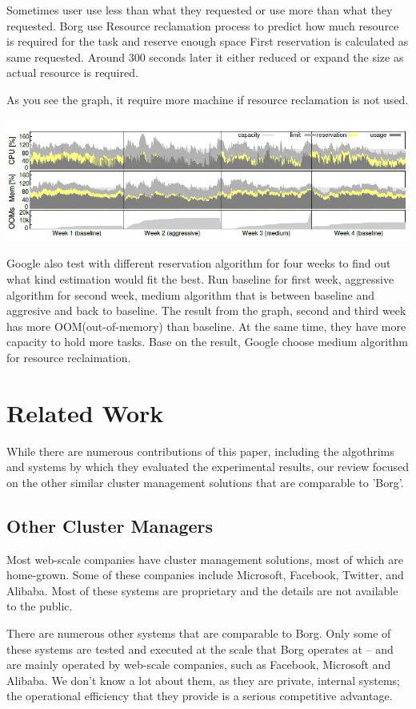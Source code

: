 \documentclass[runningheads,a4paper]{llncs}
\begin{document}
 Sometimes user use less than what they requested or use more than what they requested.
Borg use Resource reclamation process to predict how much resource is required for the task and reserve enough space
First reservation is calculated as same requested. Around 300 seconds later it either reduced or expand the size as actual resource is required.

As you see the graph, it require more machine if resource reclamation is not used.

\includegraphics{reclamation2}

Google also test with different reservation algorithm for four weeks to find out what kind estimation would fit the best.
Run baseline for first week, aggressive algorithm for second week, medium algorithm that is between baseline and aggresive and back to baseline.
The result from the graph, second and third week has more OOM(out-of-memory) than baseline.
At the same time, they have more capacity to hold more tasks.
Base on the result, Google choose medium algorithm for resource reclaimation.

\section{Related Work}
While there are numerous contributions of this paper, including the algothrims and systems by which they evaluated the experimental results, our review focused on the other similar cluster management solutions that are comparable to 'Borg'.

\subsection{Other Cluster Managers}
Most web-scale companies have cluster management solutions, most of which are home-grown.  Some of these companies include Microsoft, Facebook, Twitter, and Alibaba.  Most of these systems are proprietary and the details are not available to the public.  

There are numerous other systems that are comparable to Borg.
Only some of these systems are tested and executed at the scale that Borg operates at -- and are mainly operated by web-scale companies, such as Facebook, Microsoft and Alibaba.  We don’t know a lot about them, as they are private, internal systems; the operational efficiency that they provide is a serious competitive advantage.
\end{document}
